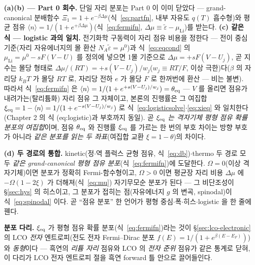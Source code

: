 \textbf{(a)(b) --- Part 0 회수.} 단일 자리 분포는 Part 0 이 이미 닫았다 --- grand-canonical
분배함수 $\Xi_1=1+e^{-\beta\Delta\mu}$(식~\eqref{eq:partfn}, 내부 자유도 $q(T)$ 흡수형)와 평균 점유
$\langle n\rangle=1/(1+e^{+\beta\Delta\mu})$(식~\eqref{eq:fermifn},
$\Delta\mu\equiv\tilde\varepsilon-\mu_\mathrm{Li}$)를 받는다. \textbf{(c) 같은 식 --- logistic 과의 일치.}
전기화학 구동력이 자리 점유 비용을 정한다 --- 전이 중심 기준(자리 자유에너지의 몰 환산 $N_A\tilde\varepsilon=\mu^0$)과
식~\eqref{eq:eqcond} 의 $\mu_\mathrm{Li}=\mu^0-sF(V-U)$ 를 정의에 넣으면 1몰 기준으로
$\Delta\mu=+sF(V-U_j)$, 곧 지수는 몰당 형태로
$\Delta\mu/(RT)=+s(V-U_j)/w_j$($w_j\equiv RT/F$, 이상 극한)다($\beta$ 의 자리당 $k_BT$ 가 몰당 $RT$ 로,
자리당 전하 $e$ 가 몰당 $F$ 로 한꺼번에 환산 --- 비는 불변). 따라서 식~\eqref{eq:fermifn} 은
$\langle n\rangle=1/(1+e^{+s(V-U_j)/w_j})=\theta_{\mathrm{eq}}$ --- $V$ 를 올리면 점유가 내려가는(탈리튬화) 자리 점유
그 자체이고, 본론의 진행률은 그 여집합 $\xi_{\mathrm{eq}}=1-\langle n\rangle=1/(1+e^{-s(V-U_j)/w_j})$ 로
식~\eqref{eq:logisticsolve}$\cdot$\eqref{eq:xieq} 와 일치한다(Chapter 2 의 식 (eq:logistic)과 부호까지 동일).
곧 \emph{$\xi_{\mathrm{eq}}$ 는 격자기체 평형 점유 확률 분포의 여집합}이며, 점유 $\theta_{\mathrm{eq}}$ 와 진행률 $\xi_{\mathrm{eq}}$ 를
가르는 한 번의 부호 차이는 방향 부호가 아니라 \emph{같은 분포를 읽는 두 좌표}(여집합 교환
$\xi=1-\theta$)의 차이다.

\textbf{(d) 두 경로의 통합.} kinetic(정$\cdot$역 플럭스 균형 점유, 식~\eqref{eq:db})$\cdot$thermo 두 경로
모두 \emph{같은 grand-canonical 평형 점유 분포}(식~\eqref{eq:fermifn})에 도달한다. $\Omega=0$(이상 격자기체)이면 분포가 정확히 Fermi-함수형이고, $\Omega>0$
이면 평균장 자리 비용 $\Delta\mu$ 에 $-\Omega(1-2\xi)$ 가 더해져(식~\eqref{eq:mu}) 자기무모순 분포가 된다 --- 그
비단조성이 \S\ref{sec:hys} 의 히스이고, 그 분포가 접히는 점(자유에너지 $g$ 의 변곡, spinodal)이 식~\eqref{eq:spinodal} 이다. 곧 ``점유 분포''
한 언어가 평형 중심$\cdot$폭$\cdot$히스$\cdot$logistic 을 한 줄에 꿴다.

\begin{keybox}
\textbf{분포 다리.} $\xi_{\mathrm{eq}}$ 가 평형 점유 확률 분포(식~\eqref{eq:fermifn})라는 것이 \S\ref{sec:lco-electronic}
의 LCO \emph{전자} 엔트로피(전도 전자 Fermi--Dirac 분포 $f(E)=1/(1+e^{\beta(E-E_F)})$)와 \emph{동형}이다 ---
흑연의 \emph{리튬 자리} 점유와 LCO 의 \emph{전자 준위} 점유가 같은 통계로 닫혀, 이 다리가 LCO 전자 엔트로피
절을 흑연 forward 틀 안으로 끌어들인다.
\end{keybox}

